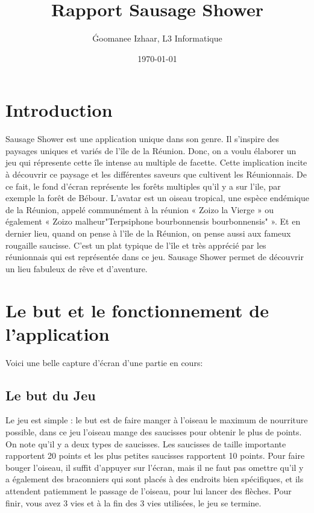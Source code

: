 \documentclass{article}
\title{Rapport Sausage Shower}
\author{\'Goomanee Izhaar, L3 Informatique}
\date{\today}
\begin{document}
\maketitle %


\begin{abstract}
  
\end{abstract}


\section{Introduction}
\label{section:intro} %

 Sausage Shower est une application unique dans son genre. Il s’inspire des paysages uniques et variés de l’île de la Réunion. Donc, on a voulu élaborer un jeu qui répresente cette île intense au multiple de facette. Cette implication incite à découvrir ce paysage et les différentes saveurs que cultivent les Réunionnais. De ce fait, le fond d'écran représente les forêts multiples qu’il y a sur l'ile, par exemple la forêt de Bébour. L'avatar est un oiseau tropical, une espèce endémique de la Réunion, appelé communément à la réunion « Zoizo la Vierge » ou également « Zoizo malheur"Terpsiphone bourbonnensis bourbonnensis" ». 
Et en dernier lieu, quand on pense à l’île de la Réunion, on pense aussi aux fameux rougaille saucisse. C’est un plat typique de l’île et très apprécié par les réunionnais qui est représentée dans ce jeu. 
Sausage Shower permet de découvrir un lieu fabuleux de rêve et d’aventure.


\section{Le but et le fonctionnement de l'application}
\label{section:Le but}
Voici une belle capture d'écran d'une partie en cours:

\subsection{ Le but du Jeu}


Le jeu est simple : le but est de faire manger à l’oiseau le maximum de nourriture possible, dans ce jeu l’oiseau mange des saucisses pour obtenir le plus de points. On note qu'il y a deux types de saucisses. Les saucisses de taille importante rapportent 20 points et les plus petites saucisses rapportent 10 points. Pour faire bouger l'oiseau, il suffit d'appuyer sur l'écran, mais il ne faut pas omettre qu'il y a également des braconniers qui sont placés à des endroits bien spécifiques, et ils attendent patiemment le passage de l’oiseau, pour lui lancer des flèches. Pour finir, vous avez 3 vies et à la fin des 3 vies utilisées, le jeu se termine.
\end{document}
